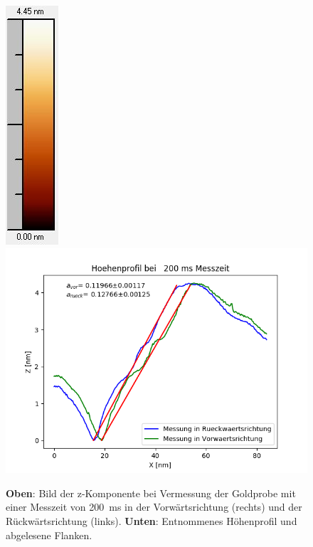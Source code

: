 \documentclass[12pt,a4paper]{article}
\begin{document}
\begin{figure}
\includegraphics[scale=0.6]{Bilder/Anhang/Zeit/0_2_Zeit_nach_Skala.jpg}
\includegraphics[scale=0.6]{Bilder/Anhang/Zeit/Profil_Zeit_200.png}
\caption{\textbf{Oben}: Bild der z-Komponente bei Vermessung der Goldprobe mit einer Messzeit von \SI{200}{ms} in der Vorwärtsrichtung (rechts) und der Rückwärtsrichtung (links). \textbf{Unten}: Entnommenes Höhenprofil und abgelesene Flanken.}
\end{figure}
\end{document}
